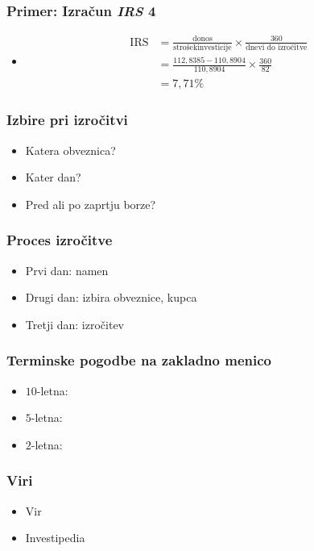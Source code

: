 \documentclass[14pt]{beamer}
\begin{document}
\begin{frame}
    \frametitle{Primer: Izračun \textit{IRS} 4}
    
    \begin{itemize}
        \item
                \begin{align*}
                    \text{IRS} 
                    &= \frac{\text{donos}}{\text{strošekinvesticije}} \times 
                        \frac{360}{\text{dnevi do izročitve}} \\
                    &= \frac{112,8385 - 110,8904}{110,8904} \times \frac{360}{82} \\
                    &= 7,71\% 
                \end{align*}
            
    \end{itemize}

    \note[item]{}

\end{frame}


\begin{frame}
    \frametitle{Izbire pri izročitvi}
    
    \begin{itemize}
        \item Katera obveznica?
        \item Kater dan?
        \item Pred ali po zaprtju borze?
    \end{itemize}


\end{frame}


\begin{frame}
    \frametitle{Proces izročitve}
    
    \begin{itemize}
        \item Prvi dan: namen
        \item Drugi dan: izbira obveznice, kupca
        \item Tretji dan: izročitev
    \end{itemize}


\end{frame}


\begin{frame}
    \frametitle{Terminske pogodbe na zakladno menico}
    
    \begin{itemize}
        \item $10$-letna:
        \item $5$-letna:
        \item $2$-letna:
    \end{itemize}


\end{frame}


\begin{frame}
    \frametitle{Viri}
    
    \begin{itemize}
        \item Vir 
        \item Investipedia
    \end{itemize}

\end{frame}
\end{document}

